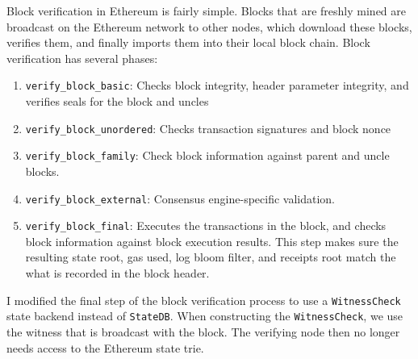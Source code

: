 \documentclass[12pt]{article}
\begin{document}
Block verification in Ethereum is fairly simple. Blocks that are freshly mined are broadcast on the Ethereum network to other nodes, which download these blocks, verifies them, and finally imports them into their local block chain. Block verification has several phases:
\begin{enumerate}
  \item \texttt{verify\_block\_basic}: Checks block integrity, header parameter integrity, and verifies seals for the block and uncles
  \item \texttt{verify\_block\_unordered}: Checks transaction signatures and block nonce
  \item \texttt{verify\_block\_family}: Check block information against parent and uncle blocks.
  \item \texttt{verify\_block\_external}: Consensus engine-specific validation.
  \item \texttt{verify\_block\_final}: Executes the transactions in the block, and checks block information against block execution results. This step makes sure the resulting state root, gas used, log bloom filter, and receipts root match the what is recorded in the block header.
\end{enumerate}

I modified the final step of the block verification process to use a \texttt{WitnessCheck} state backend instead of \texttt{StateDB}. When constructing the \texttt{WitnessCheck}, we use the witness that is broadcast with the block. The verifying node then no longer needs access to the Ethereum state trie.
\end{document}
